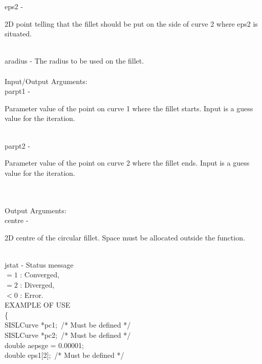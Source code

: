         \>\>    {\fov eps2}    \> - \>
        \begin{minipg2}
          2D point telling that the fillet should be put on the
          side of curve 2 where {\fov eps2} is situated.
        \end{minipg2}\\[0.8ex]
        \>\>    {\fov aradius} \> - \> The radius to be used on the fillet.\\
\\
        \>Input/Output Arguments:\\
        \>\>    {\fov parpt1}  \> - \>
        \begin{minipg2}
          Parameter value of the point on curve 1 where the
          fillet starts. Input is a guess value for the iteration.
        \end{minipg2}\\[0.8ex]
        \>\>    {\fov parpt2}  \> - \>
        \begin{minipg2}
          Parameter value of the point on curve 2 where the
          fillet ends. Input is a guess value for the iteration.
        \end{minipg2}\\[0.8ex]
\\
        \>Output Arguments:\\
        \>\>    {\fov centre}  \> - \>
        \begin{minipg2}
          2D centre of the circular fillet.  Space must be
          allocated outside the function.
        \end{minipg2}\\[0.8ex]
        \>\>    {\fov jstat} \> - \> Status message\\
                \>\>\>\>\> $= 1$      : Converged,\\
                \>\>\>\>\> $= 2$      : Diverged,\\
                \>\>\>\>\> $< 0$      : Error.\\
\newpagetabs
EXAMPLE OF USE\\
        \>      \{ \\
        \>\>    SISLCurve \> *{\fov pc1}; \,/* Must be defined */ \\
        \>\>    SISLCurve \> *{\fov pc2}; \,/* Must be defined */ \\
        \>\>    double    \> {\fov aepsge} = 0.00001;\\
        \>\>    double    \> {\fov eps1}[2]; \,/* Must be defined */ \\
